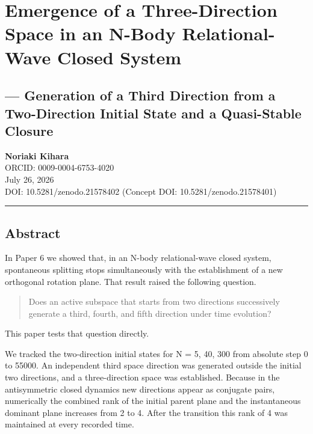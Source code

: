 \documentclass[
  a4paper,
]{article}
\author{}
\date{}
\begin{document}
\section{Emergence of a Three-Direction Space in an N-Body
Relational-Wave Closed
System}\label{emergence-of-a-three-direction-space-in-an-n-body-relational-wave-closed-system}

\subsection{--- Generation of a Third Direction from a Two-Direction
Initial State and a Quasi-Stable
Closure}\label{generation-of-a-third-direction-from-a-two-direction-initial-state-and-a-quasi-stable-closure}

\textbf{Noriaki Kihara}\\
ORCID: 0009-0004-6753-4020\\
July 26, 2026\\
DOI: 10.5281/zenodo.21578402 (Concept DOI: 10.5281/zenodo.21578401)

\begin{center}\rule{0.5\linewidth}{0.5pt}\end{center}

\subsection{Abstract}\label{abstract}

In Paper 6 we showed that, in an N-body relational-wave closed system,
spontaneous splitting stops simultaneously with the establishment of a
new orthogonal rotation plane. That result raised the following
question.

\begin{quote}
Does an active subspace that starts from two directions successively
generate a third, fourth, and fifth direction under time evolution?
\end{quote}

This paper tests that question directly.

We tracked the two-direction initial states for N = 5, 40, 300 from
absolute step 0 to 55000. An independent third space direction was
generated outside the initial two directions, and a three-direction
space was established. Because in the antisymmetric closed dynamics new
directions appear as conjugate pairs, numerically the combined rank of
the initial parent plane and the instantaneous dominant plane increases
from 2 to 4. After the transition this rank of 4 was maintained at every
recorded time.
\end{document}
